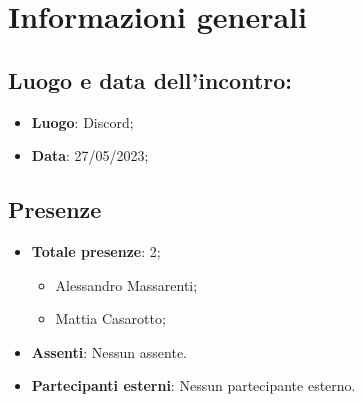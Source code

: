 \section{Informazioni generali}
    \subsection{Luogo e data dell'incontro:}
    \begin{itemize}
        \item \textbf{Luogo}: Discord;
        \item \textbf{Data}: 27/05/2023;
    \end{itemize}
    \subsection{Presenze}
    \begin{itemize}
        \item \textbf{Totale presenze}: 2;
        \begin{itemize}
            \item Alessandro Massarenti;
            \item Mattia Casarotto;
        \end{itemize}
        \item \textbf{Assenti}: Nessun assente.
        \item \textbf{Partecipanti esterni}: Nessun partecipante esterno.
    \end{itemize}